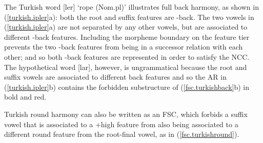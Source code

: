 \documentclass[,doc,floatsintext]{apa6}
\theoremstyle{definition}
\theoremstyle{definition}
\theoremstyle{definition}
\theoremstyle{remark}
\begin{document}
\noindent The Turkish word {[}ler{]} `rope (Nom.pl)'
illustrates full back harmony, as shown in (\ref{turkish.ipler}a): both
the root and suffix features are -back. The two vowels in
(\ref{turkish.ipler}a) are not separated by any other vowels, but are
associated to different -back features. Including the morpheme boundary
on the feature tier prevents the two -back features from being in a
successor relation with each other; and so both -back features are
represented in order to satisfy the NCC. The hypothetical word
{[}lar{]}, however, is ungrammatical because the root
and suffix vowels are associated to different back features and so the
AR in (\ref{turkish.ipler}b) contains the forbidden substructure of
(\ref{fsc.turkishback}b) in bold and red.

Turkish round harmony can also be written as an FSC, which forbids a
suffix vowel that is associated to a +high feature from also being
associated to a different round feature from the root-final vowel, as in
(\ref{fsc.turkishround}).

\begin{exe}
\ex \label{fsc.turkishround}
\end{exe}
\end{document}
